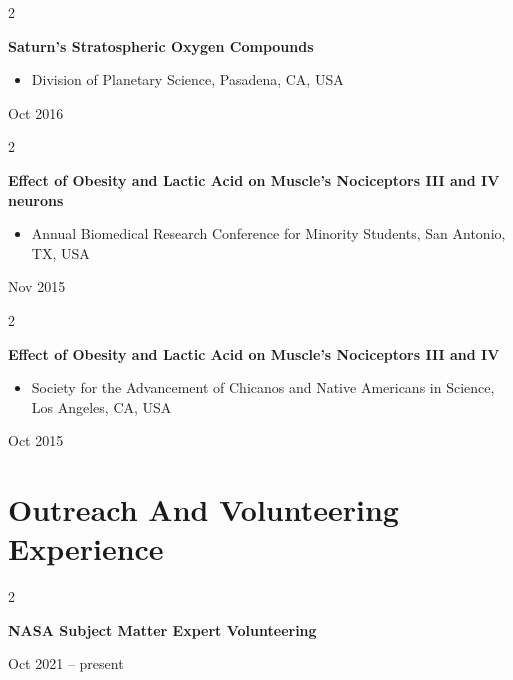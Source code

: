 \documentclass[10pt, letterpaper]{article}
\newenvironment{highlights}{
    \begin{itemize}[
        topsep=0.10 cm,
        parsep=0.10 cm,
        partopsep=0pt,
        itemsep=0pt,
        leftmargin=0.4 cm + 10pt
    ]
}{
    \end{itemize}
} %
\newenvironment{twocolentry}[2][]{
    \onecolentry
    \def\secondColumn{#2}
    \setcolumnwidth{\fill, 4.5 cm}
    \begin{paracol}{2}
}{
    \switchcolumn \raggedleft \secondColumn
    \end{paracol}
    \endonecolentry
} %
\begin{document}
        \vspace{0.2 cm}

        \begin{twocolentry}{
            Oct 2016
        }
            \textbf{Saturn's Stratospheric Oxygen Compounds}
            \begin{highlights}
                \item Division of Planetary Science, Pasadena, CA, USA
            \end{highlights}
        \end{twocolentry}


        \vspace{0.2 cm}

        \begin{twocolentry}{
            Nov 2015
        }
            \textbf{Effect of Obesity and Lactic Acid on Muscle's Nociceptors III and IV neurons}
            \begin{highlights}
                \item Annual Biomedical Research Conference for Minority Students, San Antonio, TX, USA
            \end{highlights}
        \end{twocolentry}


        \vspace{0.2 cm}

        \begin{twocolentry}{
            Oct 2015
        }
            \textbf{Effect of Obesity and Lactic Acid on Muscle's Nociceptors III and IV}
            \begin{highlights}
                \item Society for the Advancement of Chicanos and Native Americans in Science, Los Angeles, CA, USA
            \end{highlights}
        \end{twocolentry}



    
    \section{Outreach And Volunteering Experience}



        
        \begin{twocolentry}{
            Oct 2021 – present
        }
            \textbf{NASA Subject Matter Expert Volunteering}
        \end{twocolentry}
\end{document}
